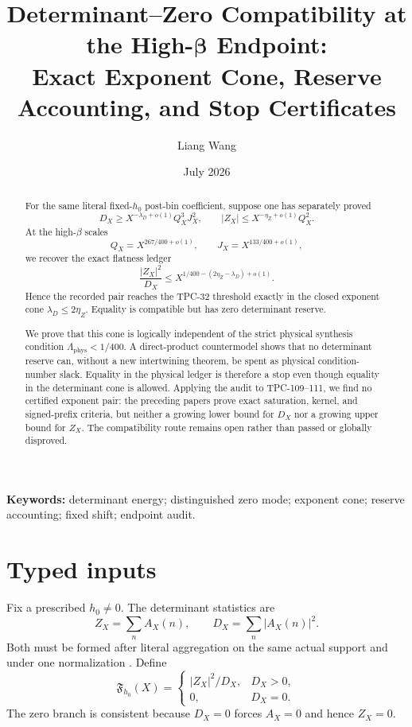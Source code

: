 \documentclass[11pt,a4paper]{article}
\title{\bfseries Determinant--Zero Compatibility at the High-\(\boldsymbol\beta\) Endpoint:\\
Exact Exponent Cone, Reserve Accounting, and Stop Certificates}
\author{Liang Wang}
\date{July 2026}
\theoremstyle{definition}
\theoremstyle{remark}
\newcommand{\Flat}{\mathfrak F}
\begin{document}
\maketitle

\begin{abstract}
For the same literal fixed-\(h_0\) post-bin coefficient, suppose one
has separately proved
\[
 D_X\ge X^{-\lambda_D+o(1)}Q_X^3J_X^2,\qquad
 |Z_X|\le X^{-\eta_Z+o(1)}Q_X^2.
\]
At the high-\(\beta\) scales
\[
 Q_X=X^{267/400+o(1)},\qquad
 J_X=X^{133/400+o(1)},
\]
we recover the exact flatness ledger
\[
 \frac{|Z_X|^2}{D_X}
 \le
 X^{1/400-(2\eta_Z-\lambda_D)+o(1)}.
\]
Hence the recorded pair reaches the TPC-32 threshold exactly in the
closed exponent cone
\(\lambda_D\le2\eta_Z\).  Equality is compatible but has zero
determinant reserve.

We prove that this cone is logically independent of the strict
physical synthesis condition
\(\Lambda_{\mathrm{phys}}<1/400\).  A direct-product countermodel
shows that no determinant reserve can, without a new intertwining
theorem, be spent as physical condition-number slack.  Equality in
the physical ledger is therefore a stop even though equality in the
determinant cone is allowed.  Applying the audit to TPC-109--111,
we find no certified exponent pair: the preceding papers prove exact
saturation, kernel, and signed-prefix criteria, but neither a
growing lower bound for \(D_X\) nor a growing upper bound for
\(Z_X\).  The compatibility route remains open rather than passed
or globally disproved.
\end{abstract}

\medskip
\noindent\textbf{Keywords:} determinant energy; distinguished zero
mode; exponent cone; reserve accounting; fixed shift; endpoint audit.

\section{Typed inputs}

Fix a prescribed \(h_0\ne0\).  The determinant statistics are
\[
 Z_X=\sum_nA_X(n),\qquad
 D_X=\sum_n|A_X(n)|^2.
\]
Both must be formed after literal aggregation on the same actual
support and under one normalization
\citep{WangTPC81,WangTPC82}.  Define
\[
 \Flat_{h_0}(X)=
 \begin{cases}
 |Z_X|^2/D_X,&D_X>0,\\
 0,&D_X=0.
 \end{cases}
\]
The zero branch is consistent because \(D_X=0\) forces \(A_X=0\)
and hence \(Z_X=0\).
\end{document}
